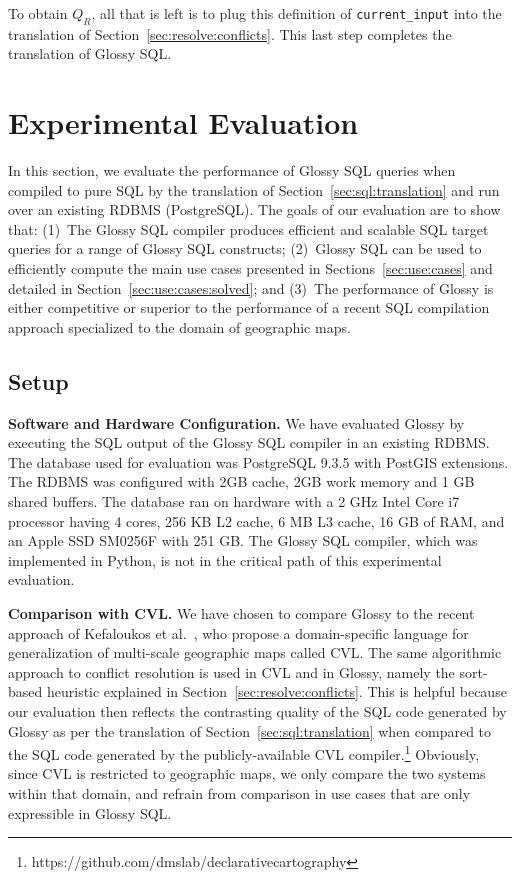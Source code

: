 \documentclass[11pt, oneside]{report}
\newcommand{\minisec}[1]{\noindent\textbf{#1.}}
\begin{document}
{To obtain $Q_R$, all that is left is to plug  this definition of \texttt{current\_input} into the translation of Section~\ref{sec:resolve:conflicts}. This last step completes the translation of Glossy SQL.

\section{Experimental Evaluation}
\label{sec:experimental:evaluation}

In this section, we evaluate the performance of Glossy SQL queries when compiled to pure SQL by the  translation of Section~\ref{sec:sql:translation} and run over an existing RDBMS (PostgreSQL). The goals of our evaluation are to show that: 
(1)~The Glossy SQL compiler produces efficient and scalable SQL target queries for a range of Glossy SQL constructs; (2)~Glossy SQL can be used to efficiently compute the main use cases presented in Sections~\ref{sec:use:cases} and detailed in Section~\ref{sec:use:cases:solved}; and (3)~The performance of Glossy is either competitive or superior to the performance of a recent SQL compilation approach specialized to the domain of geographic maps. 


\subsection{Setup}
\minisec{Software and Hardware Configuration}
We have evaluated Glossy by executing the SQL output of the Glossy SQL compiler in an existing RDBMS. The database used for evaluation was PostgreSQL 9.3.5 with PostGIS extensions. The RDBMS was configured with 2GB cache, 2GB work memory and 1 GB shared buffers. The database ran on hardware with a 2 GHz Intel Core i7 processor having 4 cores, 256 KB L2 cache, 6 MB L3 cache, 16 GB of RAM, and an Apple SSD SM0256F with 251 GB. The Glossy SQL compiler, which was implemented in Python, is not in the critical path of this experimental evaluation.

\minisec{Comparison with CVL}
We have chosen to compare Glossy to the recent approach of Kefaloukos et al.~\cite{kefaloukos2014declarative}, who propose a domain-specific language for generalization of multi-scale geographic maps called CVL. The same algorithmic approach to conflict resolution is used in CVL and in Glossy, namely the sort-based heuristic explained in Section~\ref{sec:resolve:conflicts}. This is helpful because our evaluation then reflects the contrasting quality of the SQL code generated by Glossy as per the translation of Section~\ref{sec:sql:translation} when compared to the SQL code generated by the publicly-available CVL compiler.\footnote{https://github.com/dmslab/declarativecartography} Obviously, since CVL is restricted to geographic maps, we only compare the two systems within that domain, and refrain from comparison in use cases that are only expressible in Glossy SQL.  

}
\end{document}

